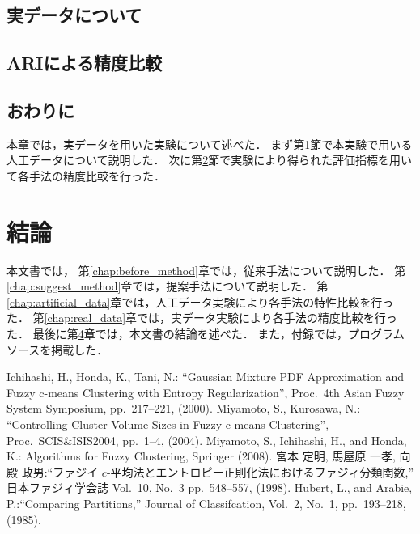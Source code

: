\documentclass[a4j,12pt,dvipdfmx,oneside]{jsbook}
\theoremstyle{definition}
\begin{document}
\section{実データについて}\label{sec:about_real_data}
%
\section{ARIによる精度比較}\label{sec:ari_compare}
%
\section{おわりに}\label{sec:real_data_summary}
本章では，実データを用いた実験について述べた．
まず第\ref{sec:about_real_data}節で本実験で用いる人工データについて説明した．
次に第\ref{sec:ari_compare}節で実験により得られた評価指標を用いて各手法の精度比較を行った．
%
%
%
%
\chapter{結論}\label{chap:conclusion}
本文書では，
第\ref{chap:before_method}章では，従来手法について説明した．
第\ref{chap:suggest_method}章では，提案手法について説明した．
第\ref{chap:artificial_data}章では，人工データ実験により各手法の特性比較を行った．
第\ref{chap:real_data}章では，実データ実験により各手法の精度比較を行った．
最後に第\ref{chap:conclusion}章では，本文書の結論を述べた．
また，付録では，プログラムソースを掲載した．
%
%
%
%
%
%
\begin{thebibliography}{5}
Ichihashi, H., Honda, K., Tani, N.: ``Gaussian Mixture PDF Approximation and Fuzzy c-means Clustering with Entropy Regularization'', Proc.~4th Asian Fuzzy System Symposium, pp.~217--221, (2000).
Miyamoto, S., Kurosawa, N.: ``Controlling Cluster Volume Sizes in Fuzzy c-means Clustering'', Proc.~SCIS\&ISIS2004, pp.~1--4, (2004).
Miyamoto, S., Ichihashi, H., and Honda, K.: Algorithms for Fuzzy Clustering, Springer (2008).
宮本 定明, 馬屋原 一孝, 向殿 政男:``ファジイ $c$-平均法とエントロピー正則化法におけるファジィ分類関数,''  日本ファジィ学会誌 Vol.~10, No.~3  pp.~548--557, (1998).
 Hubert, L., and Arabie, P.:``Comparing Partitions,'' Journal of Classifcation, Vol.~2, No.~1,
pp.~193--218, (1985).
\end{thebibliography}
%
\end{document}
